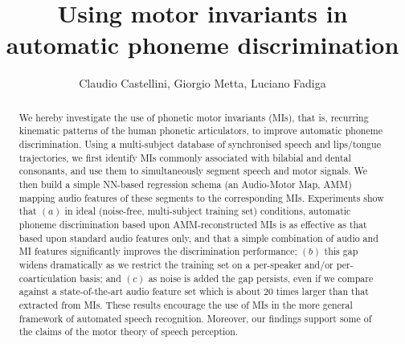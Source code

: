 \documentclass{pnastwo}
\begin{document}

\title{Using motor invariants in automatic phoneme discrimination}

\author{
Claudio Castellini,
Giorgio Metta,
Luciano Fadiga
}


\maketitle

\begin{article}

\begin{abstract}

  We hereby investigate the use of phonetic motor invariants (MIs),
  that is, recurring kinematic patterns of the human phonetic articulators,
  to improve automatic phoneme discrimination. Using a multi-subject
  database of synchronised speech and lips/tongue trajectories, we first
  identify MIs commonly associated with bilabial and dental consonants,
  and use them to simultaneously segment speech and motor signals.
  We then build a simple NN-based regression schema (an Audio-Motor
  Map, AMM) mapping audio features of these segments to the corresponding
  MIs. Experiments show that $(a)$ in ideal (noise-free, multi-subject training set)
  conditions, automatic phoneme discrimination based upon AMM-reconstructed
  MIs is as effective as that based upon standard audio features
  only, and that a simple combination of audio and MI features significantly
  improves the discrimination performance; $(b)$ this gap widens dramatically
  as we restrict the training set on a per-speaker and/or per-coarticulation basis;
  and $(c)$ as noise is added the gap persists, even if we compare against
  a state-of-the-art audio feature set which is about $20$ times larger than
  that extracted from MIs. These results encourage the use of MIs in the more
  general framework of automated speech recognition. Moreover, our findings 
  support some of the claims of the motor theory of speech perception.

\end{abstract}



\end{article}
\end{document}
